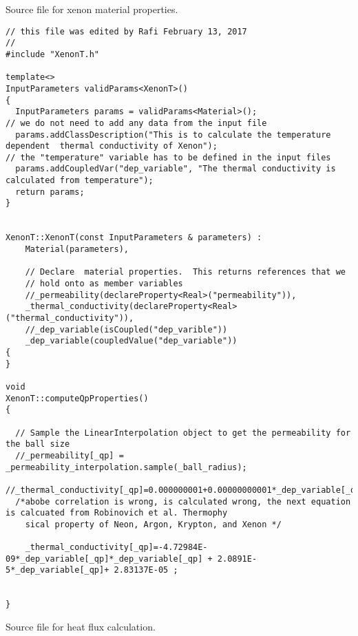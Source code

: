 \pagebreak
\lstset{style=cpp}
Source file for xenon material properties.
\begin{lstlisting}
// this file was edited by Rafi February 13, 2017
// 
#include "XenonT.h"

template<>
InputParameters validParams<XenonT>()
{
  InputParameters params = validParams<Material>();
// we do not need to add any data from the input file
  params.addClassDescription("This is to calculate the temperature dependent  thermal conductivity of Xenon");
// the "temperature" variable has to be defined in the input files
  params.addCoupledVar("dep_variable", "The thermal conductivity is calculated from temperature");
  return params;
}


XenonT::XenonT(const InputParameters & parameters) :
    Material(parameters),

    // Declare  material properties.  This returns references that we
    // hold onto as member variables
    //_permeability(declareProperty<Real>("permeability")),
	_thermal_conductivity(declareProperty<Real>("thermal_conductivity")),
	//_dep_variable(isCoupled("dep_varible"))
	_dep_variable(coupledValue("dep_variable"))
{
}

void
XenonT::computeQpProperties()
{

  // Sample the LinearInterpolation object to get the permeability for the ball size
  //_permeability[_qp] = _permeability_interpolation.sample(_ball_radius);
  //_thermal_conductivity[_qp]=0.000000001+0.00000000001*_dep_variable[_qp];
  /*abobe correlation is wrong, is calculated wrong, the next equation is calcuated from Robinovich et al. Thermophy
	sical property of Neon, Argon, Krypton, and Xenon */

	_thermal_conductivity[_qp]=-4.72984E-09*_dep_variable[_qp]*_dep_variable[_qp] + 2.0891E-5*_dep_variable[_qp]+ 2.83137E-05 ;
	 
	
}
\end{lstlisting}
\pagebreak
Source file for heat flux calculation.
\lstset{style=cpp}
